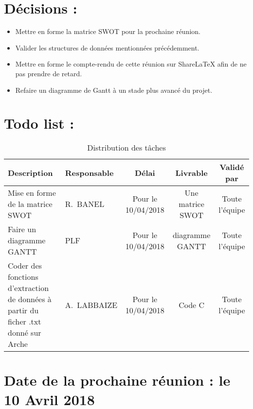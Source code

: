 \documentclass[11pt]{meetingmins}
\begin{document}
\newpage

\section{Décisions :}
\begin{itemize}
    \item Mettre en forme la matrice SWOT pour la prochaine réunion.
    \item Valider les structures de données mentionnées précédemment.
    \item Mettre en forme le compte-rendu de cette réunion sur ShareLaTeX afin de ne pas prendre de retard.
    \item Refaire un diagramme de Gantt à un stade plus avancé du projet.
\end{itemize}
\section{Todo list :}
\begin{table}[h]
    \centering
    \begin{tabular}{|p{4cm}|p{3cm}|c|c|c|}
    \hline
        \rowcolor{yellow} Description  & Responsable & Délai & Livrable & Validé par 
        \tabularnewline \hline
        
        Mise en forme de la matrice SWOT & R.~BANEL & Pour le 10/04/2018 & Une matrice SWOT & Toute l'équipe \tabularnewline \hline
        
        Faire un diagramme GANTT & PLF & Pour le 10/04/2018 & diagramme GANTT & Toute l'équipe
        \tabularnewline \hline 
        
        Coder des fonctions d'extraction de données à partir du ficher .txt donné sur Arche  & A.~LABBAIZE & Pour le 10/04/2018 & Code C & Toute l'équipe \tabularnewline \hline
        
        
        
    \end{tabular}
    \caption{Distribution des tâches}
    \label{tab:my_label}
\end{table}

\section{Date de la prochaine réunion : \textnormal{le 10 Avril 2018} }
\end{document}
